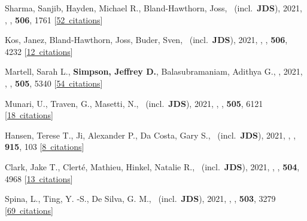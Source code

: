 \item[{\color{numcolor}\scriptsize60}] Sharma, Sanjib, Hayden, Michael R., Bland-Hawthorn, Joss, \etal\ (incl.\ \textbf{JDS}), 2021, , \mnras, \textbf{506}, 1761 [\href{https://ui.adsabs.harvard.edu/#abs/2021MNRAS.506.1761S}{52~citations}]

\item[{\color{numcolor}\scriptsize59}] Kos, Janez, Bland-Hawthorn, Joss, Buder, Sven, \etal\ (incl.\ \textbf{JDS}), 2021, , \mnras, \textbf{506}, 4232 [\href{https://ui.adsabs.harvard.edu/#abs/2021MNRAS.506.4232K}{12~citations}]

\item[{\color{numcolor}\scriptsize58}] Martell, Sarah L., \textbf{Simpson, Jeffrey D.}, Balasubramaniam, Adithya G., \etal, 2021, , \mnras, \textbf{505}, 5340 [\href{https://ui.adsabs.harvard.edu/#abs/2021MNRAS.505.5340M}{54~citations}]

\item[{\color{numcolor}\scriptsize57}] Munari, U., Traven, G., Masetti, N., \etal\ (incl.\ \textbf{JDS}), 2021, , \mnras, \textbf{505}, 6121 [\href{https://ui.adsabs.harvard.edu/#abs/2021MNRAS.505.6121M}{18~citations}]

\item[{\color{numcolor}\scriptsize56}] Hansen, Terese T., Ji, Alexander P., Da Costa, Gary S., \etal\ (incl.\ \textbf{JDS}), 2021, , \apj, \textbf{915}, 103 [\href{https://ui.adsabs.harvard.edu/#abs/2021ApJ...915..103H}{8~citations}]

\item[{\color{numcolor}\scriptsize55}] Clark, Jake T., Clert{\'e}, Mathieu, Hinkel, Natalie R., \etal\ (incl.\ \textbf{JDS}), 2021, , \mnras, \textbf{504}, 4968 [\href{https://ui.adsabs.harvard.edu/#abs/2021MNRAS.504.4968C}{13~citations}]

\item[{\color{numcolor}\scriptsize54}] Spina, L., Ting, Y. -S., De Silva, G. M., \etal\ (incl.\ \textbf{JDS}), 2021, , \mnras, \textbf{503}, 3279 [\href{https://ui.adsabs.harvard.edu/#abs/2021MNRAS.503.3279S}{69~citations}]

